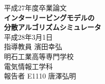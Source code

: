
\begin{titlepage}
	\centering
	\vspace*{3.5cm}
	{\huge 平成27年度卒業論文}
	\vspace{1.5cm} \\
	{\huge \textbf{インターリービングモデルの \\ 分散アルゴリズムシミュレータ}}
	\vspace{5cm} \\
	{\LARGE 平成28年3月1日}
	\vspace{1.0cm} \\
	{\LARGE 指導教員  濱田幸弘}
	\vspace{3.5cm} \\
	{\LARGE 明石工業高等専門学校}
	\vspace{1.0cm} \\
	{\LARGE 電気情報工学科}
	\vspace{1.0cm} \\
	{\LARGE 報告者  E1110 唐澤弘明}
\end{titlepage}
